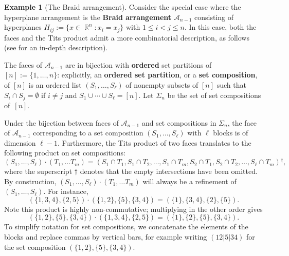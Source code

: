\documentclass[11pt, oneside, reqno]{amsart}
\theoremstyle{definition}
\newtheorem{example}[theorem]{Example}
\numberwithin{equation}{section}
\DeclareMathOperator{\R}{\mathbb{R}}
\newcommand{\defn}[1]{{\color{RoyalBlue}\bf#1}}
\begin{document}
\begin{example}[The Braid arrangement]\label{ex:braidarrangement} \rm
    Consider the special case where the hyperplane arrangement is the
    \defn{Braid arrangement} $\mathcal{A}_{n-1}$
    consisting of hyperplanes $H_{ij}:=
    \{x \in \R^n: x_i = x_j\}$ with $1 \leq i < j \leq n$.
    In this case, both the faces and the Tits product admit a more combinatorial
    description, as follows (see \cite[Chapter 6]{am17} for an in-depth description).

    The faces of $\mathcal{A}_{n-1}$ are in bijection with \defn{ordered} set partitions of
    $[n]:= \{1, \ldots, n\}$: explicitly, an \defn{ordered set partition},
    or a \defn{set composition}, of $[n]$ is an ordered list $(S_1, \ldots, S_\ell)$
    of nonempty subsets of $[n]$ such that $S_i \cap S_j
    = \emptyset$ if $i \neq j$ and $S_1 \cup \cdots \cup S_\ell = [n]$.
    Let $\Sigma_n$ be the set of set compositions of~$[n]$.

    Under the bijection between faces of $\mathcal{A}_{n-1}$ and set compositions in $\Sigma_n$,
    the face of $\mathcal{A}_{n-1}$ corresponding to a set composition $(S_1, \ldots,
    S_\ell)$ with $\ell$ blocks is of dimension $\ell-1$.
    Furthermore, the Tits product of two faces translates to the following product
    on set compositions:
    \[ (S_1, \ldots, S_{\ell}) \cdot (T_1, \ldots T_{m}) = (S_1 \cap T_1, S_1 \cap T_2, \ldots, S_1 \cap T_m, S_2 \cap T_1, S_2 \cap T_2, \ldots, S_{\ell} \cap T_m){^\dagger},\]
    where the superscript $\dagger$ denotes that the empty intersections have been omitted.
    By construction, $(S_1, \ldots, S_{\ell}) \cdot (T_1, \ldots T_{m})$ will always be a refinement of $(S_1, \ldots, S_{\ell})$.
    For instance,
    \[ ( \{ 1,3, 4 \}, \{ 2, 5 \}) \cdot (\{1,2 \}, \{5 \}, \{ 3,4 \}) = (\{ 1 \}, \{3,4 \}, \{ 2 \}, \{ 5 \}). \]
    Note this product is highly non-commutative; multiplying in the other order gives
    \[  (\{1,2 \}, \{5 \}, \{ 3,4 \}) \cdot ( \{ 1,3, 4 \}, \{ 2, 5 \})= (\{ 1 \}, \{ 2 \}, \{ 5 \}, \{3,4 \}). \]
    To simplify notation for set compositions, we concatenate the elements of
    the blocks and replace commas by vertical bars, for example writing $(12|5|34)$ for the
    set composition $(\{1,2 \}, \{5 \}, \{ 3,4 \})$.
\end{example}
\end{document}
